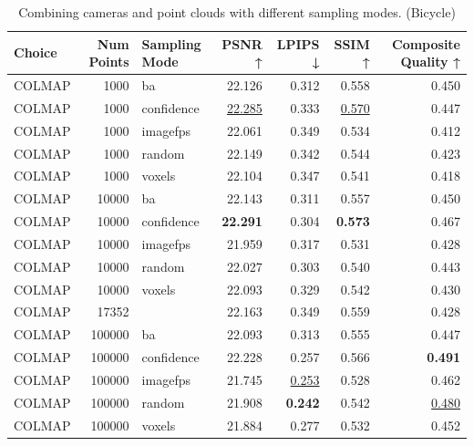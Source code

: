 \begin{table}[H]
\caption{Combining cameras and point clouds with different sampling modes. (Bicycle)}
\label{tab:07_combined_sampling_mode_bicycle}
\small
\begin{tabular}{lrlrrrr}
\toprule
Choice & Num Points & Sampling Mode & PSNR ↑ & LPIPS ↓ & SSIM ↑ & Composite Quality ↑ \\
\midrule
COLMAP & 1000 & ba & 22.126 & 0.312 & 0.558 & 0.450 \\
COLMAP & 1000 & confidence & \underline{22.285} & 0.333 & \underline{0.570} & 0.447 \\
COLMAP & 1000 & imagefps & 22.061 & 0.349 & 0.534 & 0.412 \\
COLMAP & 1000 & random & 22.149 & 0.342 & 0.544 & 0.423 \\
COLMAP & 1000 & voxels & 22.104 & 0.347 & 0.541 & 0.418 \\
COLMAP & 10000 & ba & 22.143 & 0.311 & 0.557 & 0.450 \\
COLMAP & 10000 & confidence & \textbf{22.291} & 0.304 & \textbf{0.573} & 0.467 \\
COLMAP & 10000 & imagefps & 21.959 & 0.317 & 0.531 & 0.428 \\
COLMAP & 10000 & random & 22.027 & 0.303 & 0.540 & 0.443 \\
COLMAP & 10000 & voxels & 22.093 & 0.329 & 0.542 & 0.430 \\
COLMAP & 17352 &  & 22.163 & 0.349 & 0.559 & 0.428 \\
COLMAP & 100000 & ba & 22.093 & 0.313 & 0.555 & 0.447 \\
COLMAP & 100000 & confidence & 22.228 & 0.257 & 0.566 & \textbf{0.491} \\
COLMAP & 100000 & imagefps & 21.745 & \underline{0.253} & 0.528 & 0.462 \\
COLMAP & 100000 & random & 21.908 & \textbf{0.242} & 0.542 & \underline{0.480} \\
COLMAP & 100000 & voxels & 21.884 & 0.277 & 0.532 & 0.452 \\
\bottomrule
\end{tabular}
\end{table}

